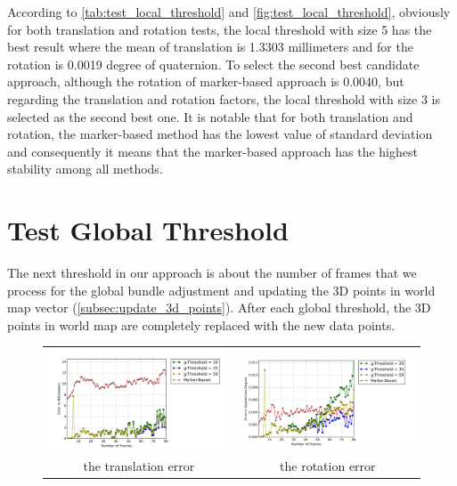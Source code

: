 According to \autoref{tab:test_local_threshold} and \autoref{fig:test_local_threshold}, obviously for both translation and rotation tests, the local threshold with size 5 has the best result where the mean of translation is 1.3303 millimeters and for the rotation is 0.0019 degree of quaternion. To select the second best candidate approach, although the rotation of marker-based approach is 0.0040, but regarding the translation and rotation factors, the local threshold with size 3 is selected as the second best one. It is notable that for both translation and rotation, the marker-based method has the lowest value of standard deviation and consequently it means that the marker-based approach has the highest stability among all methods.

\section{Test Global Threshold} \label{sec:global_threshold}
The next threshold in our approach is about the number of frames that we process for the global bundle adjustment and updating the 3D points in world map vector (\autoref{subsec:update_3d_points}). After each global threshold, the 3D points in world map are completely replaced with the new data points.
\begin{figure}[H]
\centering
\begin{tabular}{cc}
  \includegraphics[width=80mm]{figures/global/graph_translation} &   \includegraphics[width=80mm]{figures/global/graph_rotation}  \\
  the translation error & the rotation error \\[6pt]
\end{tabular}
\caption{}\label{fig:test_global_threshold}

\end{figure}
